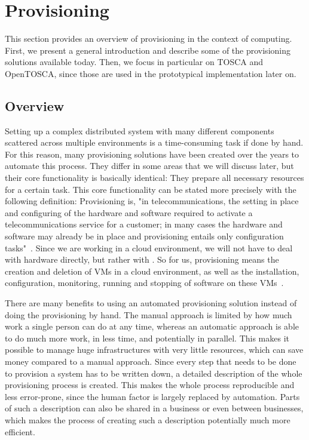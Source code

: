 \section{Provisioning}
\label{fundamentals:provisioning}

This section provides an overview of provisioning in the context of computing.
First, we present a general introduction and describe some of the provisioning solutions available today.
Then, we focus in particular on TOSCA and OpenTOSCA, since those are used in the prototypical implementation later on.

\subsection{Overview}

Setting up a complex distributed system with many different components scattered across multiple environments is a time-consuming task if done by hand.
For this reason, many provisioning solutions have been created over the years to automate this process.
They differ in some areas that we will discuss later, but their core functionality is basically identical: They prepare all necessary resources for a certain task.
This core functionality can be stated more precisely with the following definition: Provisioning is, "in telecommunications, the setting in place and configuring of the hardware and software required to activate a telecommunications service for a customer; in many cases the hardware and software may already be in place and provisioning entails only configuration tasks"~\autocite{def:provisioning}.
Since we are working in a cloud environment, we will not have to deal with hardware directly, but rather with .
So for us, provisioning means the creation and deletion of VMs in a cloud environment, as well as the installation, configuration, monitoring, running and stopping of software on these VMs~\autocite{provisioning:architecture}.

There are many benefits to using an automated provisioning solution instead of doing the provisioning by hand.
The manual approach is limited by how much work a single person can do at any time, whereas an automatic approach is able to do much more work, in less time, and potentially in parallel.
This makes it possible to manage huge infrastructures with very little resources, which can save money compared to a manual approach.
Since every step that needs to be done to provision a system has to be written down, a detailed description of the whole provisioning process is created.
This makes the whole process reproducible and less error-prone, since the human factor is largely replaced by automation.
Parts of such a description can also be shared in a business or even between businesses, which makes the process of creating such a description potentially much more efficient.

